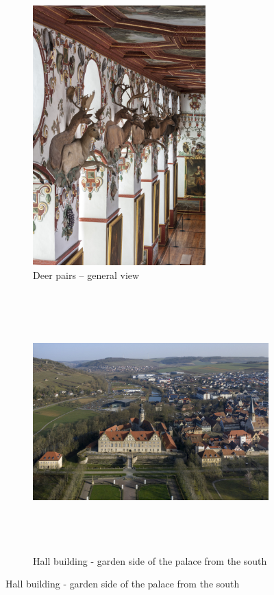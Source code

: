 \documentclass[
  a4paper,
]{book}
\begin{document}
\begin{figure}
\begin{figure}[H]    
  \includegraphics[height=10cm]{images/fmd10005866a.jpg}
  \caption{Deer pairs – general view}
  \label{fig:{images/fmd10005866a.jpg}}
\end{figure}

\clearpage

\begin{figure}[H]    
  \includegraphics[height=10cm]{images/fmd10024321a.jpg}
  \caption{Hall building - garden side of the palace from the south}
  \label{fig:{images/fmd10024321a.jpg}}
\end{figure}

\clearpage


\end{figure}
\end{document}
